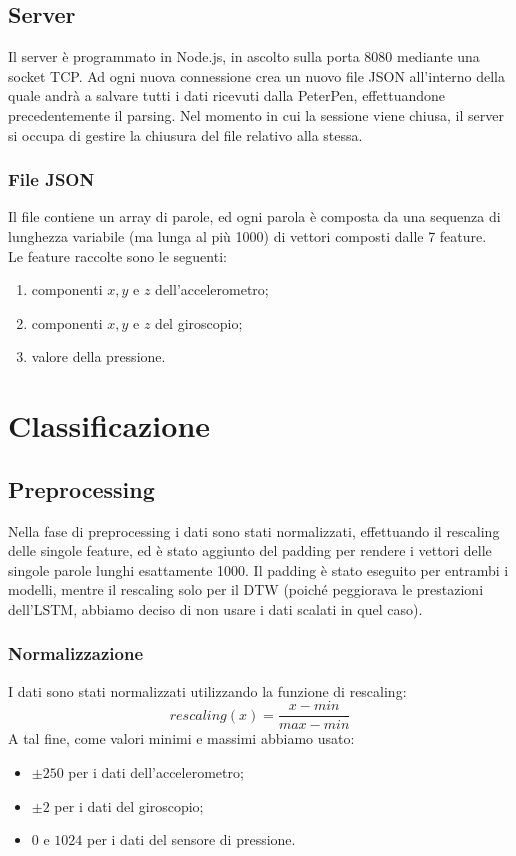 \documentclass[8pt,notitlepage]{report}
\begin{document}
	\section{Server}
		Il server è programmato in Node.js, in ascolto sulla porta 8080 mediante una socket TCP. Ad ogni nuova connessione crea un nuovo file JSON all'interno della quale andrà a salvare tutti i dati ricevuti dalla PeterPen, effettuandone precedentemente il parsing. Nel momento in cui la sessione viene chiusa, il server si occupa di gestire la chiusura del file relativo alla stessa.
		
		\subsection{File JSON}
			Il file contiene un array di parole, ed ogni parola è composta da una sequenza di lunghezza variabile (ma lunga al più 1000) di vettori composti dalle 7 feature. \\
			Le feature raccolte sono le seguenti:
			\begin{enumerate}
				\setlength\itemsep{.1em}
				\item componenti $ x, y $ e $ z $ dell'accelerometro;
				\item componenti $ x, y $ e $ z $ del giroscopio;
				\item valore della pressione.
			\end{enumerate}


\chapter{Classificazione}

	\section{Preprocessing}
		Nella fase di preprocessing i dati sono stati normalizzati, effettuando il rescaling delle singole feature, ed è stato aggiunto del padding per rendere i vettori delle singole parole lunghi esattamente 1000. Il padding è stato eseguito per entrambi i modelli, mentre il rescaling solo per il DTW (poiché peggiorava le prestazioni dell'LSTM, abbiamo deciso di non usare i dati scalati in quel caso). \\
		
		\subsection{Normalizzazione}
			I  dati sono stati normalizzati utilizzando la funzione di rescaling: 
			\[ rescaling(x) = \frac{x - min}{max - min} \]
			A tal fine, come valori minimi e massimi abbiamo usato:
			\begin{itemize}
				\setlength\itemsep{.01em}
				\item $ \pm 250 $ per i dati dell'accelerometro;
				\item $ \pm 2 $ per i dati del giroscopio;
				\item $ 0 $ e $ 1024 $ per i dati del sensore di pressione.
			\end{itemize}
	
\end{document}
